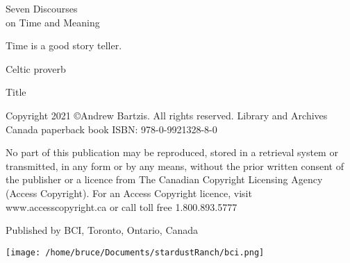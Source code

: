 \documentclass[letterpaper,9pt,twoside,titlepage,onecolumn,openany]{book}
\begin{document}
\newpage{}
\thispagestyle{empty}

\vspace{30mm}

\begin{center}
\huge{Seven Discourses\\
on Time and Meaning}
\large{}
\end{center}

\vspace{10mm}


\newpage




\begin{center}


\end{center}

\vspace{5mm}
\begin{center}

Time is a good story teller.


Celtic proverb

\end{center}

\newpage
\thispagestyle{empty}



\begin{center}



\large{Title}

\end{center}




\vspace{5mm}
\noindent
Copyright 2021  \copyright Andrew Bartzis. All rights reserved.
Library and Archives Canada paperback book ISBN: 978-0-9921328-8-0


\vspace{5mm}
\noindent
No part of this publication may be reproduced, stored in a retrieval system or transmitted, in any form or by any means, without the prior written consent of the publisher or a licence from The Canadian Copyright Licensing Agency (Access Copyright). For an Access Copyright licence, visit www.accesscopyright.ca or call toll free 1.800.893.5777


\vspace{5mm}
\noindent
Published by BCI, Toronto, Ontario, Canada


\begin{center}


\texttt{[image: /home/bruce/Documents/stardustRanch/bci.png]}

\end{center}
\end{document}
